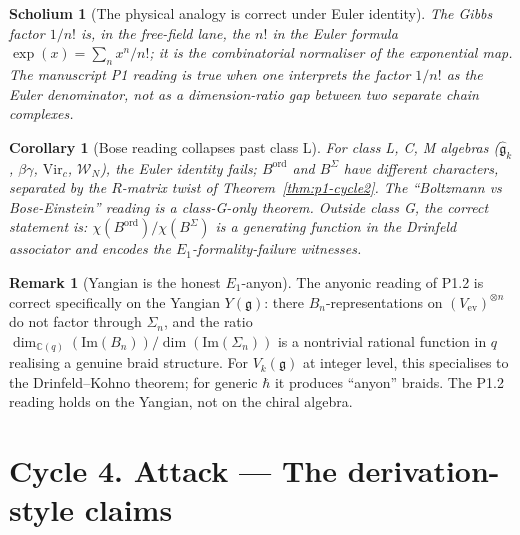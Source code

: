 \documentclass[11pt]{article}
\newtheorem{corollary}[theorem]{Corollary}
\newtheorem{scholium}[theorem]{Scholium}
\theoremstyle{definition}
\newtheorem{remark}[theorem]{Remark}
\newcommand{\ord}{\mathrm{ord}}
\begin{document}
\begin{scholium}[The physical analogy is correct under Euler identity]\label{sch:cy3-gibbs-place}
The Gibbs factor $1/n!$ is, in the free-field lane, the $n!$ in the
Euler formula
$\exp(x) = \sum_n x^n/n!$; it is the combinatorial normaliser of the
exponential map. The manuscript P1 reading is true when one
interprets the factor $1/n!$ as the Euler denominator, not as a
dimension-ratio gap between two separate chain complexes.
\end{scholium}

\begin{corollary}[Bose reading collapses past class L]\label{cor:bose-past-gauss}
For class L, C, M algebras ($\widehat{\mathfrak g}_k$, $\beta\gamma$,
$\mathrm{Vir}_c$, $\mathcal W_N$), the Euler identity fails; $B^{\ord}$
and $B^{\Sigma}$ have different characters, separated by the
$R$-matrix twist of Theorem~\ref{thm:p1-cycle2}. The ``Boltzmann vs
Bose-Einstein'' reading is a class-G-only theorem. Outside class G,
the correct statement is: $\chi(B^{\ord})/\chi(B^{\Sigma})$ is a
generating function in the Drinfeld associator and encodes the
$E_1$-formality-failure witnesses.
\end{corollary}

\begin{remark}[Yangian is the honest $E_1$-anyon]\label{rem:yangian-anyon}
The anyonic reading of P1.2 is correct specifically on the Yangian
$Y(\mathfrak g)$: there $B_n$-representations on
$(V_{\mathrm{ev}})^{\otimes n}$ do not factor through $\Sigma_n$, and the
ratio $\dim_{\mathbb C(q)}(\mathrm{Im}(B_n)) / \dim(\mathrm{Im}(\Sigma_n))$
is a nontrivial rational function in $q$ realising a genuine braid
structure. For $V_k(\mathfrak g)$ at integer level, this specialises
to the Drinfeld--Kohno theorem; for generic $\hbar$ it produces
``anyon'' braids. The P1.2 reading holds on the Yangian, not on the
chiral algebra.
\end{remark}

\section*{Cycle 4. Attack --- The derivation-style claims}
\end{document}
